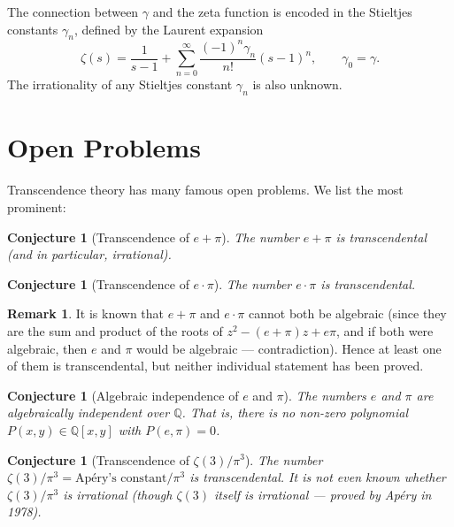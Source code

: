 \documentclass[12pt,a4paper]{amsart}
\newtheorem{conjecture}[theorem]{Conjecture}
\theoremstyle{definition}
\newtheorem{remark}[theorem]{Remark}
\begin{document}
The connection between $\gamma$ and the zeta function is encoded in the
Stieltjes constants $\gamma_n$, defined by the Laurent expansion
\[
  \zeta(s) = \frac{1}{s-1} + \sum_{n=0}^\infty \frac{(-1)^n \gamma_n}{n!} (s-1)^n,
  \qquad \gamma_0 = \gamma.
\]
The irrationality of any Stieltjes constant $\gamma_n$ is also unknown.


\section{Open Problems}
\label{sec:open}

Transcendence theory has many famous open problems. We list the most prominent:

\begin{conjecture}[Transcendence of $e + \pi$]
\label{conj:e+pi}
The number $e + \pi$ is transcendental (and in particular, irrational).
\end{conjecture}

\begin{conjecture}[Transcendence of $e \cdot \pi$]
\label{conj:e-pi}
The number $e \cdot \pi$ is transcendental.
\end{conjecture}

\begin{remark}
It is known that $e + \pi$ and $e \cdot \pi$ cannot both be algebraic
(since they are the sum and product of the roots of $z^2 - (e+\pi)z + e\pi$,
and if both were algebraic, then $e$ and $\pi$ would be algebraic — contradiction).
Hence at least one of them is transcendental, but neither individual statement
has been proved.
\end{remark}

\begin{conjecture}[Algebraic independence of $e$ and $\pi$]
\label{conj:e-pi-independence}
The numbers $e$ and $\pi$ are algebraically independent over $\mathbb{Q}$.
That is, there is no non-zero polynomial $P(x,y) \in \mathbb{Q}[x,y]$ with
$P(e,\pi) = 0$.
\end{conjecture}

\begin{conjecture}[Transcendence of $\zeta(3)/\pi^3$]
\label{conj:zeta3}
The number $\zeta(3)/\pi^3 = \text{Ap\'ery's constant}/\pi^3$ is transcendental.
It is not even known whether $\zeta(3)/\pi^3$ is irrational (though $\zeta(3)$
itself is irrational — proved by Ap\'ery in 1978).
\end{conjecture}
\end{document}
